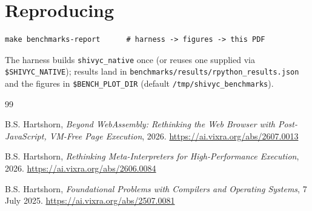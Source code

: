 \documentclass[11pt]{article}
\begin{document}
\section{Reproducing}

\begin{verbatim}
make benchmarks-report      # harness -> figures -> this PDF
\end{verbatim}

\noindent
The harness builds \texttt{shivyc\_native} once (or reuses one supplied via
\texttt{\$SHIVYC\_NATIVE}); results land in
\texttt{benchmarks/results/rpython\_results.json} and the figures in
\texttt{\$BENCH\_PLOT\_DIR} (default \texttt{/tmp/shivyc\_benchmarks}).


\begin{thebibliography}{99}

B.S. Hartshorn, \emph{Beyond WebAssembly: Rethinking the Web Browser with
Post-JavaScript, VM-Free Page Execution}, 2026.
\url{https://ai.vixra.org/abs/2607.0013}

B.S. Hartshorn, \emph{Rethinking Meta-Interpreters for High-Performance
Execution}, 2026. \url{https://ai.vixra.org/abs/2606.0084}

B.S. Hartshorn, \emph{Foundational Problems with Compilers and Operating
Systems}, 7 July 2025. \url{https://ai.vixra.org/abs/2507.0081}

\end{thebibliography}
\end{document}
